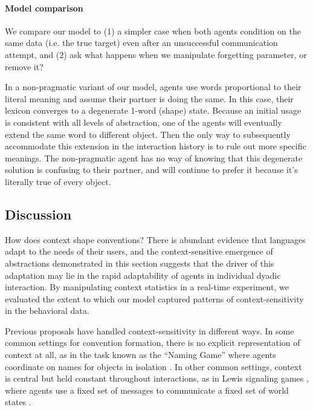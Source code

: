 \paragraph{Model comparison}


We compare our model to (1) a simpler case when both agents condition on the same data (i.e. the true target) even after an unsuccessful communication attempt, and (2) ask what happens when we manipulate forgetting parameter, or remove it?

In a non-pragmatic variant of our model, agents use words proportional to their literal meaning and assume their partner is doing the same. 
In this case, their lexicon converges to a degenerate 1-word (shape) state.
Because an initial usage is consistent with all levels of abstraction, one of the agents will eventually extend the same word to different object. 
Then the only way to subsequently accommodate this extension in the interaction history is to rule out more specific meanings. 
The non-pragmatic agent has no way of knowing that this degenerate solution is confusing to their partner, and will continue to prefer it because it's literally true of every object.

\subsection{Discussion}

How does context shape conventions? 
There is abundant evidence that languages adapt to the needs of their users, and the context-sensitive emergence of abstractions demonstrated in this section suggests that the driver of this adaptation may lie in the rapid adaptability of agents in individual dyadic interaction. 
By manipulating context statistics in a real-time experiment, we evaluated the extent to which our model captured patterns of context-sensitivity in the behavioral data.

Previous proposals have handled context-sensitivity in different ways.
In some common settings for convention formation, there is no explicit representation of context at all, as in the task known as the ``Naming Game'' where agents coordinate on names for objects in isolation \cite{steels2012experiments,baronchelli2008depth}. 
In other common settings, context is central but held constant throughout interactions, as in Lewis signaling games \cite{lewis_convention:_1969}, where agents use a fixed set of messages to communicate a fixed set of world states \cite{skyrms2010signals,BrunerEtAl14_LewisConventions}.

